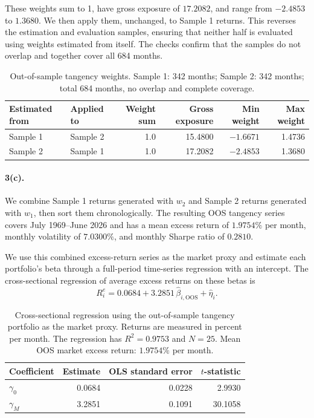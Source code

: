 These weights sum to 1, have gross exposure of $17.2082$, and range from
$-2.4853$ to $1.3680$. We then apply them, unchanged, to Sample 1 returns. This
reverses the estimation and evaluation samples, ensuring that neither half is
evaluated using weights estimated from itself. The checks confirm that the
samples do not overlap and together cover all 684 months.

\begin{table}[H]
\centering
\caption{Out-of-sample tangency weights. Sample 1: 342 months; Sample 2: 342
months; total 684 months, no overlap and complete coverage.}
\small
\begin{tabular}{llrrrr}
\toprule
Estimated from & Applied to & Weight sum & Gross exposure & Min weight & Max weight \\
\midrule
Sample 1 & Sample 2 & 1.0 & 15.4800 & $-1.6671$ & 1.4736 \\
Sample 2 & Sample 1 & 1.0 & 17.2082 & $-2.4853$ & 1.3680 \\
\bottomrule
\end{tabular}
\label{tab:p2oosw}
\end{table}

\paragraph{3(c).} We combine Sample 1 returns generated with $w_2$ and Sample 2
returns generated with $w_1$, then sort them chronologically. The resulting OOS
tangency series covers July 1969--June 2026 and has a mean excess return of
$1.9754\%$ per month, monthly volatility of $7.0300\%$, and monthly Sharpe
ratio of $0.2810$.

We use this combined excess-return series as the market proxy and estimate each
portfolio's beta through a full-period time-series regression with an
intercept. The cross-sectional regression of average excess returns on these
betas is
\[
R^e_i = 0.0684 + 3.2851\,\hat\beta_{i,\mathrm{OOS}} + \hat\eta_i .
\]

\begin{table}[H]
\centering
\caption{Cross-sectional regression using the out-of-sample tangency portfolio
as the market proxy. Returns are measured in percent per month. The regression
has $R^2 = 0.9753$ and $N = 25$. Mean OOS market excess return: $1.9754\%$ per
month.}
\small
\begin{tabular}{lrrr}
\toprule
Coefficient & Estimate & OLS standard error & $t$-statistic \\
\midrule
$\gamma_0$ & 0.0684 & 0.0228 & 2.9930 \\
$\gamma_M$ & 3.2851 & 0.1091 & 30.1058 \\
\bottomrule
\end{tabular}
\label{tab:p2q3}
\end{table}

